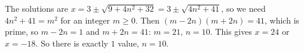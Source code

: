 The solutions are $x=3\pm\sqrt{9+4n^2+32}=3\pm\sqrt{4n^2+41}$, so we need $4n^2+41=m^2$ for an integer $m\ge0$. Then $(m-2n)(m+2n)=41$, which is prime, so $m-2n=1$ and $m+2n=41$: $m=21$, $n=10$. This gives $x=24$ or $x=-18$. So there is exactly $\boxed{1}$ value, $n=10$.
